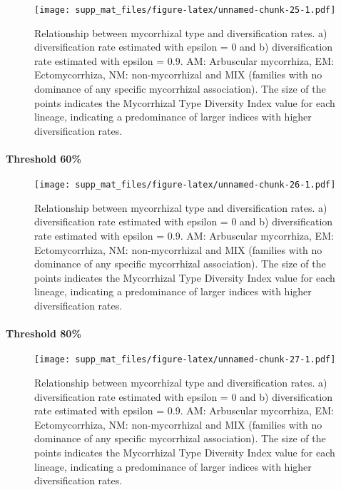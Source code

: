 \documentclass[]{article}
\let\oldparagraph\paragraph
\renewcommand{\paragraph}[1]{\oldparagraph{#1}\mbox{}}
\begin{document}
\begin{figure}
\centering
\texttt{[image: supp\_mat\_files/figure-latex/unnamed-chunk-25-1.pdf]}
\caption{Relationship between mycorrhizal type and diversification
rates. a) diversification rate estimated with epsilon = 0 and b)
diversification rate estimated with epsilon = 0.9. AM: Arbuscular
mycorrhiza, EM: Ectomycorrhiza, NM: non-mycorrhizal and MIX (families
with no dominance of any specific mycorrhizal association). The size of
the points indicates the Mycorrhizal Type Diversity Index value for each
lineage, indicating a predominance of larger indices with higher
diversification rates.}
\end{figure}

\pagebreak

\hypertarget{threshold-60-2}{%
\paragraph{Threshold 60\%}\label{threshold-60-2}}

\begin{figure}
\centering
\texttt{[image: supp\_mat\_files/figure-latex/unnamed-chunk-26-1.pdf]}
\caption{Relationship between mycorrhizal type and diversification
rates. a) diversification rate estimated with epsilon = 0 and b)
diversification rate estimated with epsilon = 0.9. AM: Arbuscular
mycorrhiza, EM: Ectomycorrhiza, NM: non-mycorrhizal and MIX (families
with no dominance of any specific mycorrhizal association). The size of
the points indicates the Mycorrhizal Type Diversity Index value for each
lineage, indicating a predominance of larger indices with higher
diversification rates.}
\end{figure}

\pagebreak

\hypertarget{threshold-80-2}{%
\paragraph{Threshold 80\%}\label{threshold-80-2}}

\begin{figure}
\centering
\texttt{[image: supp\_mat\_files/figure-latex/unnamed-chunk-27-1.pdf]}
\caption{Relationship between mycorrhizal type and diversification
rates. a) diversification rate estimated with epsilon = 0 and b)
diversification rate estimated with epsilon = 0.9. AM: Arbuscular
mycorrhiza, EM: Ectomycorrhiza, NM: non-mycorrhizal and MIX (families
with no dominance of any specific mycorrhizal association). The size of
the points indicates the Mycorrhizal Type Diversity Index value for each
lineage, indicating a predominance of larger indices with higher
diversification rates.}
\end{figure}
\end{document}
